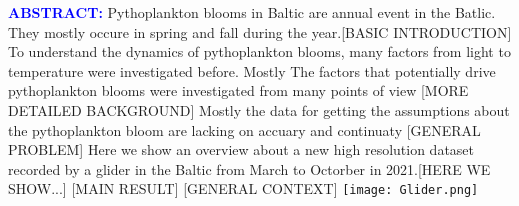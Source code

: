 \documentclass[../Main.tex]{subfiles}
\begin{document}
\begin{tcolorbox}[colback=light-orange, boxrule=0pt]
  \begin{multicols}{3}
   \textcolor{blue}{\textbf{ABSTRACT:}} Pythoplankton blooms in Baltic are annual event in the Batlic. They mostly occure in spring and fall during the year.[BASIC INTRODUCTION]
   To understand the dynamics of pythoplankton blooms, many factors from light to temperature were investigated before. Mostly 
 The factors that potentially drive pythoplankton blooms were investigated from many points of view [MORE DETAILED BACKGROUND]
Mostly the data for getting the assumptions about the pythoplankton bloom are lacking on accuary and continuaty [GENERAL PROBLEM]
Here we show an overview about a new high resolution dataset recorded by a glider in the Baltic from March to Octorber in 2021.[HERE WE SHOW...]
[MAIN RESULT]
[GENERAL CONTEXT]
  \texttt{[image: Glider.png]}
  \end{multicols}
\end{tcolorbox}
\end{document}
